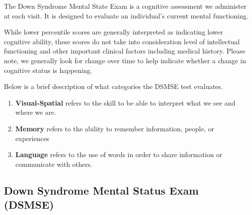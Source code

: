 The Down Syndrome Mental State Exam is a cognitive assessment we administer at
each visit. It is designed to evaluate an individual’s current mental
functioning. 

While lower percentile scores are generally interpreted as indicating lower
cognitive ability, these scores do not take into consideration level of
intellectual functioning and other important clinical factors including medical
history. Please note, we generally look for change over time to help indicate
whether a change in cognitive status is happening. 

Below is a brief description of what categories the DSMSE test evaluates.

\begin{enumerate}
    \item \textbf{Visual-Spatial} refers to the skill to be able to interpret what we see and where we are. 
    \item \textbf{Memory} refers to the ability to remember information, people, or experiences
    \item \textbf{Language} refers to the use of words in order to share information or communicate with others. 
    
\end{enumerate}

\subsection{Down Syndrome Mental Status Exam (DSMSE)}